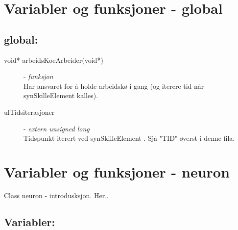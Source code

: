 

\chapter{Variabler og funksjoner - global}
\section{global:}
	\begin{description}
		\item[void* arbeidsKoeArbeider(void*)] - \textit{funksjon} \\
			Har ansvaret for å holde arbeidskø i gang (og iterere tid når synSkilleElement kalles). 
		\item[ulTidsiterasjoner] - \textit{extern unsigned long} \\
			Tidspunkt iterert ved synSkilleElement . Sjå "TID" øverst i denne fila.
	\end{description}

\pagebreak




\chapter{Variabler og funksjoner - neuron}
	Class neuron - introdusksjon. Her..

	\section{Variabler:}
